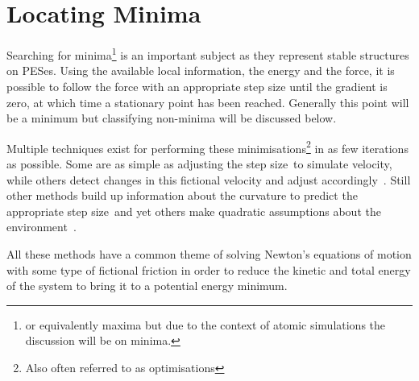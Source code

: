 \section{Locating Minima}
\label{sec:minima}
Searching for minima\footnote{or equivalently maxima but due to the context of atomic simulations the discussion will be on minima.} is an important subject as they represent stable structures on PESes.
Using the available local information, the energy and the force, it is possible to follow the force with an appropriate step size until the gradient is zero, at which time a stationary point has been reached.
Generally this point will be a minimum but classifying non-minima will be discussed below.

Multiple techniques exist for performing these minimisations\footnote{Also often referred to as optimisations} in as few iterations as possible.
Some are as simple as adjusting the step size~\citemiss to simulate velocity, while others detect changes in this fictional velocity and adjust accordingly~\citemiss.
Still other methods build up information about the curvature to predict the appropriate step size~\citemiss and yet others make quadratic assumptions about the environment~\citemiss.

All these methods have a common theme of solving Newton's equations of motion with some type of fictional friction in order to reduce the kinetic and total energy of the system to bring it to a potential energy minimum.
